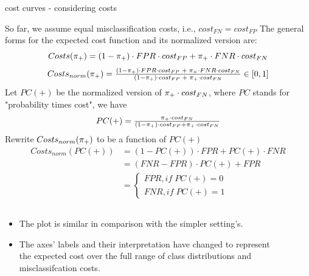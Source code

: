 \begin{vbframe}{cost curves - considering costs}
	
So far, we assume equal misclassification costs, i.e., $cost_{FN}=cost_{FP}$
The general forms for the expected cost function and its normalized version are:
$$Costs(\pi_{+}) = (1 - \pi_{+}) \cdot FPR \cdot cost_{FP} + \pi_{+} \cdot FNR \cdot cost_{FN}$$
$$Costs_{norm}(\pi_{+}) = \tfrac{(1 - \pi_{+}) \cdot FPR \cdot cost_{FP} \; + \; \pi_{+} \cdot FNR \cdot cost_{FN}}{(1 - \pi_{+}) \cdot cost_{FP} \; + \; \pi_{+} \cdot cost_{FN}} \in [0,1]$$
Let $PC(+)$ be the normalized version of $\pi_{+}\cdot cost_{FN}$, where $PC$ stands for "probability times cost", we have
$$PC(+)=\tfrac{\pi_{+}\cdot cost_{FN}}{(1-\pi_{+})\cdot cost_{FP} + \pi_{+}\cdot cost_{FN}}$$
Rewrite $Costs_{norm}(\pi_{+})$ to be a function of $PC(+)$
\begin{align*}
Costs_{norm}(PC(+)) &= (1-PC(+))\cdot FPR + PC(+)\cdot FNR \\
&= (FNR - FPR)\cdot PC(+) + FPR \\
&= \begin{cases}
  FPR, if\; PC(+) = 0 \\
  FNR, if\; PC(+) = 1
\end{cases}
\end{align*}
\vspace{-0.8cm}
\begin{columns}[T]
\begin{column}{0.5\textwidth}
\begin{itemize}
  \item The plot is similar in comparison with the simpler setting's.
  \item The axes' labels and their interpretation have changed to represent the expected cost over the full range of class distributions and misclassifcation costs.
\end{itemize}
\end{column}
\begin{column}{0.5\textwidth}
\begin{figure}
  \centering
\end{figure}
\end{column}
\end{columns}
\end{vbframe}
